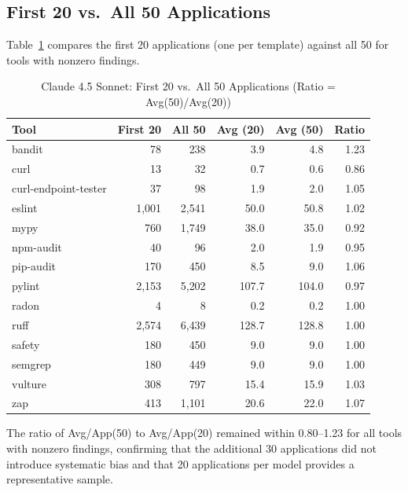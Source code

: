 \subsection{First 20 vs.\ All 50 Applications}

Table~\ref{tab:claude_20vs50} compares the first 20 applications (one per template) against all 50 for tools with nonzero findings.

\begin{table}[htbp]
    \centering
    \caption{Claude 4.5 Sonnet: First 20 vs.\ All 50 Applications (Ratio = Avg(50)/Avg(20))}
    \label{tab:claude_20vs50}
    \small
    \begin{tabular}{@{} l r r r r r @{}}
        \toprule
        \textbf{Tool} & \textbf{First 20} & \textbf{All 50} & \textbf{Avg (20)} & \textbf{Avg (50)} & \textbf{Ratio} \\
        \midrule
        bandit & 78 & 238 & 3.9 & 4.8 & 1.23 \\
        curl & 13 & 32 & 0.7 & 0.6 & 0.86 \\
        curl-endpoint-tester & 37 & 98 & 1.9 & 2.0 & 1.05 \\
        eslint & 1{,}001 & 2{,}541 & 50.0 & 50.8 & 1.02 \\
        mypy & 760 & 1{,}749 & 38.0 & 35.0 & 0.92 \\
        npm-audit & 40 & 96 & 2.0 & 1.9 & 0.95 \\
        pip-audit & 170 & 450 & 8.5 & 9.0 & 1.06 \\
        pylint & 2{,}153 & 5{,}202 & 107.7 & 104.0 & 0.97 \\
        radon & 4 & 8 & 0.2 & 0.2 & 1.00 \\
        ruff & 2{,}574 & 6{,}439 & 128.7 & 128.8 & 1.00 \\
        safety & 180 & 450 & 9.0 & 9.0 & 1.00 \\
        semgrep & 180 & 449 & 9.0 & 9.0 & 1.00 \\
        vulture & 308 & 797 & 15.4 & 15.9 & 1.03 \\
        zap & 413 & 1{,}101 & 20.6 & 22.0 & 1.07 \\
        \bottomrule
    \end{tabular}
\end{table}

The ratio of Avg/App(50) to Avg/App(20) remained within 0.80--1.23 for all tools with nonzero findings, confirming that the additional 30 applications did not introduce systematic bias and that 20 applications per model provides a representative sample.